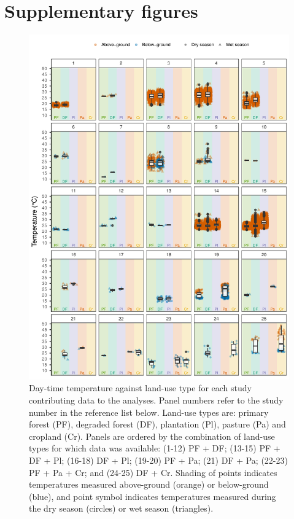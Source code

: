 \documentclass[12pt,a4paper,]{report}
\theoremstyle{definition}
\theoremstyle{definition}
\theoremstyle{definition}
\theoremstyle{remark}
\begin{document}
\section{Supplementary figures}\label{supplementary-figures-1}

\begin{figure}
\centering
\includegraphics{./figures/fig-A-1-1-1.pdf}
\caption{\label{fig:fig-A-1-1}Day-time temperature against land-use type for
each study contributing data to the analyses. Panel numbers refer to the
study number in the reference list below. Land-use types are: primary
forest (PF), degraded forest (DF), plantation (Pl), pasture (Pa) and
cropland (Cr). Panels are ordered by the combination of land-use types
for which data was available: (1-12) PF + DF; (13-15) PF + DF + Pl;
(16-18) DF + Pl; (19-20) PF + Pa; (21) DF + Pa; (22-23) PF + Pa + Cr;
and (24-25) DF + Cr. Shading of points indicates temperatures measured
above-ground (orange) or below-ground (blue), and point symbol indicates
temperatures measured during the dry season (circles) or wet season
(triangles).}
\end{figure}
\end{document}
